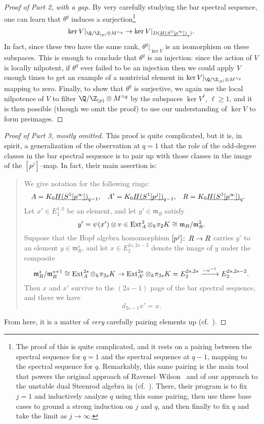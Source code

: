\begin{proof}[Proof of Part 2, with a gap]
By very carefully studying the bar spectral sequence, one can learn that \(\theta^q\) induces a surjection\footnote{The proof of this is quite complicated, and it rests on a pairing between the spectral sequence for \(q = 1\) and the spectral sequence at \(q - 1\), mapping to the spectral sequence for \(q\).  Remarkably, this same pairing is the main tool that powers the original approach of  Ravenel--Wilson~\cite{RavenelWilsonKthyOfEMSpaces} and of our approach to the unstable dual Steenrod algebra in  (cf.\ ).  There, their program is to fix \(j = 1\) and inductively analyze \(q\) using this same pairing, then use these base cases to ground a strong induction on \(j\) and \(q\), and then finally to fix \(q\) and take the limit as \(j \to \infty\).} \[\ker V|_{\Q / \Z_{(p)} \otimes M^{\wedge q}} \to \ker V|_{D(\OS{H(S^1[p^\infty])}{q})}.\]  In fact, since these two have the same rank, \(\theta^q|_{\ker V}\) is an isomorphism on these subspaces.  This is enough to conclude that \(\theta^q\) is an injection: since the action of \(V\) is locally nilpotent, if \(\theta^q\) ever failed to be an injection then we could apply \(V\) enough times to get an example of a nontrivial element in \(\ker V|_{\Q / \Z_{(p)} \otimes M^{\wedge q}}\) mapping to zero.  Finally, to show that \(\theta^q\) is surjective, we again use the local nilpotence of \(V\) to filter \(\Q / \Z_{(p)} \otimes M^{\sm q}\) by the subspaces \(\ker V^\ell\), \(\ell \ge 1\), and it is then possible (though we omit the proof) to use our understanding of \(\ker V\) to form preimages.
\end{proof}

\begin{proof}[Proof of Part 3, mostly omitted]
This proof is quite complicated, but it is, in spirit, a generalization of the observation at \(q = 1\) that the role of the odd-degree classes in the bar spectral sequence is to pair up with those classes in the image of the \([p^j]\)--map.  In fact, their main assertion is:
\begin{quote}
We give notation for the following rings:
\begin{align*}
A & = K_0 \underline{\smash{H(S^1[p^\infty])}}_{q-1}, &
A' & = K_0 \underline{\smash{H(S^1[p^j])}}_{q-1}, &
R & = K_0 \underline{\smash{H(S^1[p^\infty])}}_{q}.
\end{align*}
Let \(x' \in E_2^{1, 0}\) be an element, and let \(y' \in \mathfrak m_R\) satisfy \[y' = \psi(x') \otimes v \in \operatorname{Ext}^2_A \otimes_k \pi_2 K \cong \mathfrak m_R / \mathfrak m_R^2.\]  Suppose that the Hopf algebra homomorphism \([p^j]\colon\thinspace R \to R\) carries \(y'\) to an element \(y \in \mathfrak m_R^s\), and let \(x \in E_2^{2s, 2s-2}\) denote the image of \(y\) under the composite \[\mathfrak m_R^s / \mathfrak m_R^{s+1} \cong \operatorname{Ext}_A^{2s} \otimes_k \pi_{2s} K \to \operatorname{Ext}_{A'}^{2s} \otimes_k \pi_{2s} K = E_2^{2s, 2s} \xrightarrow{-v^{-1}} E_2^{2s, 2s-2}.\]  Then \(x\) and \(x'\) survive to the \((2s - 1)\){\th} page of the bar spectral sequence, and there we have \[d_{2s-1} x' = x.\]
\end{quote}
From here, it is a matter of \emph{very} carefully pairing elements up (cf.\ \cite[pg.\ 60]{HopkinsLurie}).
\end{proof}

